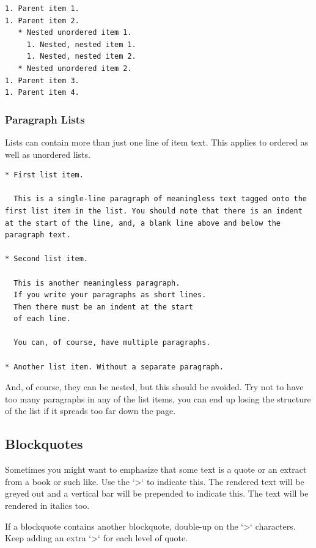 \begin{lstlisting}[caption={Nested ordered \& unordered lists.},style=myText]
1. Parent item 1.
1. Parent item 2.
   * Nested unordered item 1.
     1. Nested, nested item 1.
     1. Nested, nested item 2.
   * Nested unordered item 2.
1. Parent item 3.
1. Parent item 4.
\end{lstlisting}

\subsubsection{Paragraph Lists}\label{sect: Paragraph Lists}

Lists can contain more than just one line of item text. This applies to ordered as well as unordered lists.

\begin{lstlisting}[caption={Paragraph lists.},style=myText]
* First list item.

  This is a single-line paragraph of meaningless text tagged onto the first list item in the list. You should note that there is an indent at the start of the line, and, a blank line above and below the paragraph text.

* Second list item.

  This is another meaningless paragraph.
  If you write your paragraphs as short lines.
  Then there must be an indent at the start
  of each line.

  You can, of course, have multiple paragraphs.

* Another list item. Without a separate paragraph.
\end{lstlisting}

And, of course, they can be nested, but this should be avoided. Try not to have too many paragraphs in any of the list items, you can end up losing the structure of the list if it spreads too far down the page.


\subsection{Blockquotes}\label{sect: Blockquotes}

Sometimes you might want to emphasize that some text is a quote or an extract from a book or such like. Use the `>` to indicate this. The rendered text will be greyed out and a vertical bar will be prepended to indicate this. The text will be rendered in italics too.

If a blockquote contains another blockquote, double-up on the `>` characters. Keep adding an extra `>` for each level of quote.

